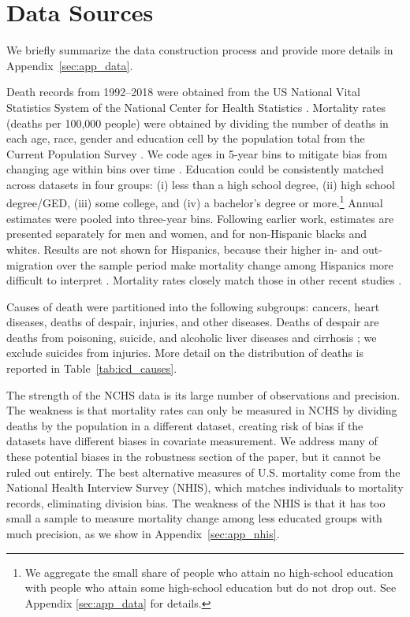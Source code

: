 \documentclass[12pt,letterpaper]{article}
\numberwithin{equation}{section}
\begin{document}
\section{Data Sources}
\label{sec:data}

We briefly summarize the data construction process and provide more
details in Appendix~\ref{sec:app_data}.

Death records from 1992--2018 were obtained from the US National Vital
Statistics System of the National Center for Health Statistics
\citep[NCHS;][]{NCHS2018}. Mortality rates (deaths per 100,000 people) were
obtained by dividing the number of deaths in each age, race, gender
and education cell by the population total from the Current
Population Survey \citep[CPS;][]{cps}. We code ages in 5-year bins to mitigate
bias from changing age within bins over time
\citep{Gelman2016,Case2017}. Education could be consistently matched
across datasets in four groups: (i) less than a high school degree,
(ii) high school degree/GED, (iii) some college, and (iv) a bachelor's
degree or more.\footnote{We aggregate the small share of people who attain no high-school
  education with people who attain some high-school education but do
  not drop out. See Appendix \ref{sec:app_data} for details.} Annual estimates were pooled into three-year bins.
Following earlier work, estimates are presented separately for men and
women, and for non-Hispanic blacks and whites. Results are not shown
for Hispanics, because their higher in- and out-migration over the
sample period make mortality change among Hispanics more difficult to
interpret \citep{Markides2005}. Mortality rates closely match those in
other recent studies \citep{Case2015,Case2017}.

Causes of death were partitioned into the following subgroups:
cancers, heart diseases, deaths of despair, injuries, and other
diseases. Deaths of despair are deaths from poisoning, suicide, and
alcoholic liver diseases and cirrhosis \citep{Kochanek2016,Case2017};
we exclude suicides from injuries. More detail on the distribution of
deaths is reported in Table~\ref{tab:icd_causes}. 

The strength of the NCHS data is its large number of observations and precision. The weakness is that mortality rates can only be measured in NCHS by dividing deaths by the population in a different dataset, creating risk of bias if the datasets have different biases in covariate measurement. We address many of these potential biases in the robustness section of the paper, but it cannot be ruled out entirely. The best alternative measures of U.S. mortality come from the National Health Interview Survey (NHIS), which matches individuals to mortality records, eliminating division bias. The weakness of the NHIS is that it has too small a sample to measure mortality change among less educated groups with much precision, as we show in Appendix~\ref{sec:app_nhis}.
\end{document}
